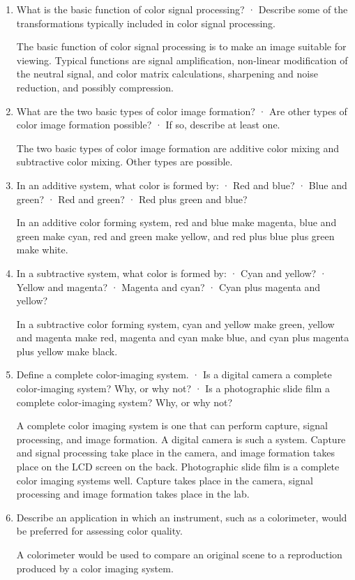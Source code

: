 \begin{enumerate}
\item What is the basic function of color signal processing?
 · Describe some of the transformations typically included in color signal processing.
\par The basic function of color signal processing is to make an
image suitable for viewing.  Typical functions are signal
amplification, non-linear modification of the neutral signal, and
color matrix calculations, sharpening and noise reduction, and
possibly compression.

\item What are the two basic types of color image formation? · Are
other types of color image formation possible? · If so, describe
at least one.
\par The two basic types of color image formation are additive
color mixing and subtractive color mixing.  Other types are
possible.

\item In an additive system, what color is formed by: · Red and
blue? · Blue and green? · Red and green? · Red plus green and
blue?
\par In an additive color forming system, red and blue make
magenta, blue and green make cyan, red and green make yellow, and
red plus blue plus green make white.

\item In a subtractive system, what color is formed by: · Cyan and
yellow? · Yellow and magenta? · Magenta and cyan? · Cyan plus
magenta and yellow?
\par In a subtractive color forming system, cyan and yellow make
green, yellow and magenta make red, magenta and cyan make blue,
and cyan plus magenta plus yellow make black.

\item Define a complete color-imaging system.
 · Is a digital camera a complete color-imaging system? Why, or why not?
 · Is a photographic slide film a complete color-imaging system? Why, or why not?
 \par A complete color imaging system is one that can perform
 capture, signal processing, and image formation.  A digital
 camera is such a system.  Capture and signal processing take
 place in the camera, and image formation takes place on the LCD
 screen on the back.  Photographic slide film is a complete color
 imaging systems well.  Capture takes place in the camera,
 signal processing and image formation takes place in the lab.

\item Describe an application in which an instrument, such as a
colorimeter, would be preferred for assessing color quality.
\par A colorimeter would be used to compare an original scene to a
reproduction produced by a color imaging system.


\end{enumerate}
